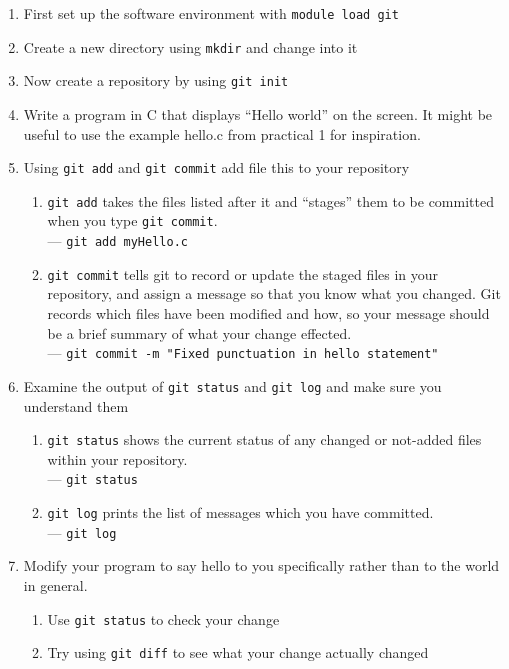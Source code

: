 \documentclass[a4paper, 12pt]{article}
\def \cc   {\tt }               %
\begin{document}
\begin{enumerate}

   \item First set up the software environment with {\cc module load git}

   \item Create a new directory using {\cc mkdir} and change into it

   \item Now create a repository by using {\cc git init}

   \item Write a program in C that displays ``Hello world'' on the screen. It might be useful to use the example hello.c from practical 1 for inspiration.

   \item Using {\cc git add} and {\cc git commit} add file this to your repository
     \begin{enumerate}
     \item{} {\cc git add} takes the files listed after it and ``stages'' them to be committed when you type {\cc git commit}. \\
       --- {\cc git add myHello.c}
     \item{} {\cc git commit} tells git to record or update the staged files in your repository, and assign a message so that you know what you changed. Git records which files have been modified and how, so your message should be a brief summary of what your change effected. \\
       --- {\cc git commit -m "Fixed punctuation in hello statement"}
     \end{enumerate}

   \item Examine the output of {\cc git status} and {\cc git log} and make sure you understand them
     \begin{enumerate}
     \item{} {\cc git status} shows the current status of any changed or not-added files within your repository. \\
       --- {\cc git status}
     \item{} {\cc git log} prints the list of messages which you have committed. \\
       --- {\cc git log}
     \end{enumerate}

   \item Modify your program to say hello to you specifically rather than to the world in general.
     \begin{enumerate}
         \item{} Use {\cc git status} to check your change
         \item{} Try using {\cc git diff} to see what your change actually changed
     \end{enumerate}


\end{enumerate}
\end{document}
